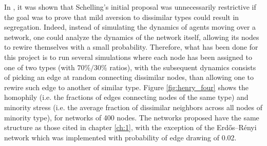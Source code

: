 In \cite{henry_emergence_2011}, it was shown that Schelling's initial proposal was unnecessarily restrictive if the goal was to prove that mild aversion to dissimilar types could result in segregation. Indeed, instead of simulating the dynamics of agents moving over a network, one could analyze the dynamics of the network itself, allowing its nodes to rewire themselves with a small probability. Therefore, what has been done for this project is to run several simulations where each node has been assigned to one of two types (with $70\%/ 30\%$ ratios), with the subsequent dynamics consists of picking an edge at random connecting dissimilar nodes, than allowing one to rewire such edge to another of similar type. Figure \ref{fig:henry_four} shows the homophily (i.e. the fractions of edges connecting nodes of the same type) and minority stress (i.e. the average fraction of dissimilar neighbors across all nodes of minority type), for networks of 400 nodes. The networks proposed have the same structure as those cited in chapter \ref{ch:1}, with the exception of the Erdős–Rényi network which was implemented with probability of edge drawing of 0.02.

\newpage